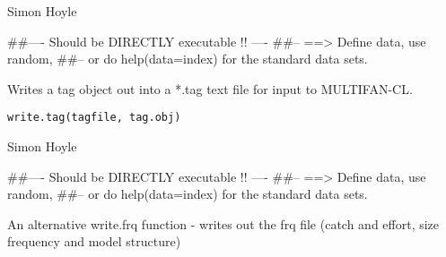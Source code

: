 \documentclass[a4paper]{book}
\begin{document}
%
\begin{Author}\relax

Simon Hoyle
\end{Author}
%
\begin{Examples}
\begin{ExampleCode}
##---- Should be DIRECTLY executable !! ----
##-- ==>  Define data, use random,
##--	or do  help(data=index)  for the standard data sets.

\end{ExampleCode}
\end{Examples}
%
\begin{Description}\relax

Writes a tag object out into a *.tag text file for input to MULTIFAN-CL. 
\end{Description}
%
\begin{Usage}
\begin{verbatim}
write.tag(tagfile, tag.obj)
\end{verbatim}
\end{Usage}
%
\begin{Arguments}
\begin{ldescription}
\item[\code{tagfile}] 


\item[\code{tag.obj}] 


\end{ldescription}
\end{Arguments}
%
\begin{Author}\relax

Simon Hoyle
\end{Author}
%
\begin{Examples}
\begin{ExampleCode}
##---- Should be DIRECTLY executable !! ----
##-- ==>  Define data, use random,
##--	or do  help(data=index)  for the standard data sets.

\end{ExampleCode}
\end{Examples}
%
\begin{Description}\relax

An alternative write.frq function - writes out the frq file (catch and effort, size frequency and model structure)
\end{Description}
\end{document}
